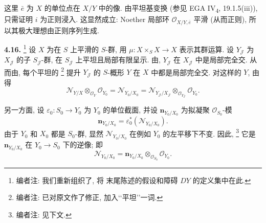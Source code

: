 这里 \(\bar e\) 为 \(X\) 的单位点在 \(X/Y\) 中的像.
由平坦基变换 (参见 EGA IV\textsubscript{4}, 19.1.5(iii)),
只需证明 \(i\) 为正则浸入. 这显然成立:
Noether 局部环 \(\mathscr O_{X/Y,\bar e}\) 平滑 (从而正则),
所以其极大理想由正则序列生成.

\medskip
\noindent{}\textbf{4.16.}
\footnote{编者注: 我们重新组织了,
将 末尾陈述的假设和障碍 \(DY\) 的定义集中在此.}
设 \(X\) 为在 \(S\) 上平滑的 \(S\)-群,
用 \(\mu:X\times_S X\to X\) 表示其群运算.
设 \(Y_{\mathscr J}\) 为 \(X_{\mathscr J}\) 的子 \(S_{\mathscr J}\)-群,
在 \(S_{\mathscr J}\) 上平坦且局部有限呈示.
由,
\(Y_{\mathscr J}\) 在 \(X_{\mathscr J}\) 中是局部完全交.
从而由, 每个平坦的
\footnote{编者注: 已对原文作了修正, 加入\lq\lq 平坦\rq\rq 一词.}
提升 \(Y_{\mathscr J}\) 的 \(S\)-概形 \(Y\) 在 \(X\) 中都是局部完全交.
对这样的 \(Y\), 由 得
\begin{equation*}
 \tag{4.16.1}\label{sga3:iii:paragraph:4-16:equation:4-16-1}
 \mathscr N_{Y/X}\otimes_{\mathscr O_Y}\mathscr O_{Y_0}
 =\mathscr N_{Y_0/X_0}
 =\mathscr N_{Y_{\mathscr J}/X_{\mathscr J}}
   \otimes_{\mathscr O_{Y_{\mathscr J}}}\mathscr O_{Y_0}.
\end{equation*}

另一方面, 设 \(\varepsilon_0:S_0\to Y_0\) 为 \(Y_0\) 的单位截面,
并设 \(\mathbf n_{Y_0/X_0}\) 为拟凝聚 \(\mathscr O_{S_0}\)-模
\[
\mathbf n_{Y_0/X_0}=\varepsilon_0^*(\mathscr N_{Y_0/X_0}).
\]
由于 \(Y_0\) 和 \(X_0\) 都是 \(S_0\)-群, 显然
\(\mathscr N_{Y_0/X_0}\) 在例如 \(Y_0\) 的左平移下不变. 因此,
\footnote{编者注: 见下文.}
它是 \(\mathbf n_{Y_0/X_0}\) 在 \(Y_0\to S_0\) 下的逆像; 即
\begin{equation*}
 \tag{4.16.2}\label{sga3:iii:paragraph:4-16:equation:4-16-2}
 \mathscr N_{Y_0/X_0}
=\mathbf n_{Y_0/X_0}\otimes_{\mathscr O_{S_0}}\mathscr O_{Y_0}.
\end{equation*}

